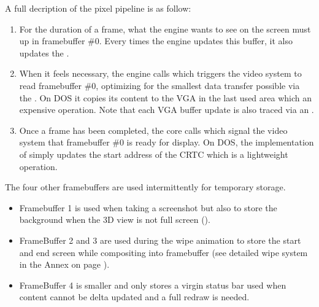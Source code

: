 \pagebreak
\par
A full decription of the pixel pipeline is as follow:
\begin{enumerate}
\item For the duration of a frame, what the engine wants to see on the screen must up in framebuffer \#0. Every times the engine updates this buffer, it also updates the .
\item When it feels necessary, the engine calls  which triggers the video system to read framebuffer \#0, optimizing for the smallest data transfer possible via the . On DOS it copies its content to the VGA in the last used area which an expensive operation. Note that each VGA buffer update is also traced via an .
\item Once a frame has been completed, the core calls   which signal the video system that framebuffer \#0 is ready for display. On DOS, the implementation of  simply updates the start address of the CRTC which is a lightweight operation.
\end{enumerate}
\par
{}
\par
The four other framebuffers are used intermittently for temporary storage.
\begin{itemize} 
\item Framebuffer 1 is used when taking a screenshot but also to store the background when the 3D view is not full screen ().

\item FrameBuffer 2 and 3 are used during the wipe animation to store the start and end screen while compositing into framebuffer (see detailed wipe system in the Annex on page \pageref{label_melt}). 
\item FrameBuffer 4 is smaller and only stores a virgin status bar used when content cannot be delta updated and a full redraw is needed. 
\end{itemize}
\par




